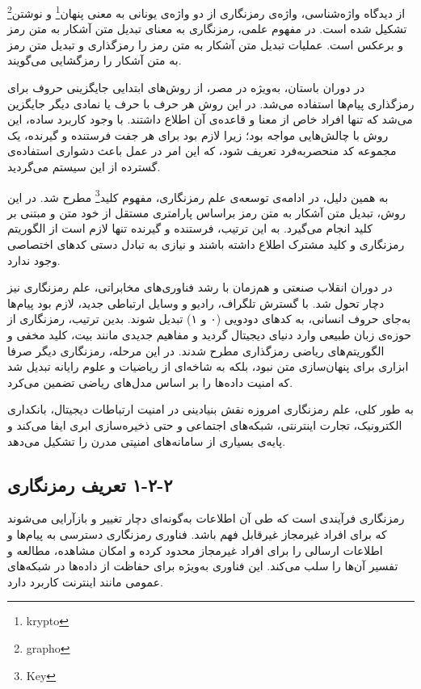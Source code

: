 از دیدگاه واژه‌شناسی، واژه‌ی رمزنگاری از دو واژه‌ی یونانی به معنی پنهان\footnote{krypto} و نوشتن\footnote{grapho} تشکیل شده است. در مفهوم علمی، رمزنگاری به معنای تبدیل متن آشکار  به متن رمز و برعکس است. عملیات تبدیل متن آشکار به متن رمز را رمزگذاری و تبدیل متن رمز به متن آشکار را رمزگشایی می‌گویند.

در دوران باستان، به‌ویژه در مصر، از روش‌های ابتدایی جایگزینی حروف برای رمزگذاری پیام‌ها استفاده می‌شد. در این روش هر حرف با حرف یا نمادی دیگر جایگزین می‌شد که تنها افراد خاص از معنا و قاعده‌ی آن اطلاع داشتند. با وجود کاربرد ساده، این روش با چالش‌هایی مواجه بود؛ زیرا لازم بود برای هر جفت فرستنده و گیرنده، یک مجموعه کد منحصربه‌فرد تعریف شود، که این امر در عمل باعث دشواری استفاده‌ی گسترده از این سیستم می‌گردید\cite{ref15}.

به همین دلیل، در ادامه‌ی توسعه‌ی علم رمزنگاری، مفهوم کلید\footnote{Key} مطرح شد. در این روش، تبدیل متن آشکار به متن رمز براساس پارامتری مستقل از خود متن و مبتنی بر کلید انجام می‌گیرد. به این ترتیب، فرستنده و گیرنده تنها لازم است از الگوریتم رمزنگاری و کلید مشترک اطلاع داشته باشند و نیازی به تبادل دستی کدهای اختصاصی وجود ندارد.

در دوران انقلاب صنعتی و هم‌زمان با رشد فناوری‌های مخابراتی، علم رمزنگاری نیز دچار تحول شد. با گسترش تلگراف، رادیو و وسایل ارتباطی جدید، لازم بود پیام‌ها به‌جای حروف انسانی، به کدهای دودویی (۰ و ۱) تبدیل شوند. بدین ترتیب، رمزنگاری از حوزه‌ی زبان طبیعی وارد دنیای دیجیتال گردید و مفاهیم جدیدی مانند بیت، کلید مخفی و الگوریتم‌های ریاضی رمزگذاری مطرح شدند. در این مرحله، رمزنگاری دیگر صرفا ابزاری برای پنهان‌سازی متن نبود، بلکه به شاخه‌ای از ریاضیات و علوم رایانه تبدیل شد که امنیت داده‌ها را بر اساس مدل‌های ریاضی تضمین می‌کرد\cite{ref16}.

به طور کلی، علم رمزنگاری امروزه نقش بنیادینی در امنیت ارتباطات دیجیتال، بانکداری الکترونیک، تجارت اینترنتی، شبکه‌های اجتماعی و حتی ذخیره‌سازی ابری ایفا می‌کند و پایه‌ی بسیاری از سامانه‌های امنیتی مدرن را تشکیل می‌دهد.

\subsection{‏۲‏-‏۲‏-‏۱‏ تعریف رمزنگاری}

رمزنگاری فرآیندی است که طی آن اطلاعات به‌گونه‌ای دچار تغییر و بازآرایی می‌شوند که برای افراد غیرمجاز غیرقابل فهم باشد. فناوری رمزنگاری دسترسی به پیام‌ها و اطلاعات ارسالی را برای افراد غیرمجاز محدود کرده و امکان مشاهده، مطالعه و تفسیر آن‌ها را سلب می‌کند. این فناوری به‌ویژه برای حفاظت از داده‌ها در شبکه‌های عمومی مانند اینترنت کاربرد دارد\cite{ref17}.

